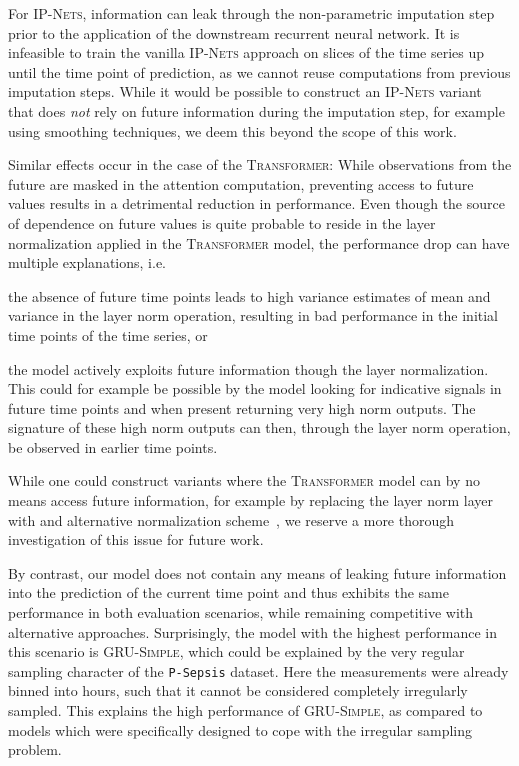\documentclass{article}
\newcommand{\dataset}[1]{\texttt{#1}}
\newcommand{\method}[1]{\textsc{#1}}
\begin{document}
For \method{IP-Nets}, information can leak through the non-parametric imputation
step prior to the application of the downstream recurrent neural network.  It
is infeasible to train the vanilla \method{IP-Nets} approach on slices of the
time series up until the time point of prediction, as we cannot reuse
computations from previous imputation steps.  While it would be possible to
construct an \method{IP-Nets} variant that does \emph{not} rely on future information
during the imputation step, for example using smoothing techniques, we deem
this beyond the scope of this work.

Similar effects occur in the case of the \method{Transformer}: While
observations from the future are masked in the attention computation,
preventing access to future values results in a detrimental reduction in
performance. Even though the source of dependence on future values is quite
probable to reside in the layer normalization applied in the
\method{Transformer} model, the performance drop can have multiple
explanations, i.e.\
\begin{inparaenum}
\item the absence of future time points leads to high variance estimates of
    mean and variance in the layer norm operation, resulting in bad performance
    in the initial time points of the time series, or
\item the model actively exploits future information though the layer
    normalization.  This could for example be possible by the model looking for
    indicative signals in future time points and when present returning very
    high norm outputs.  The signature of these high norm outputs can then,
    through the layer norm operation, be observed in earlier time points.
\end{inparaenum}
While one could construct variants where the \method{Transformer} model can by
no means access future information, for example by replacing the layer norm
layer with and alternative normalization scheme~\citep{nguyen2019transformers,
bachlechner2020rezero}, we reserve a more thorough investigation of this issue
for future work.

By contrast, our model does not contain any means of leaking future
information into the prediction of the current time point and thus
exhibits the same performance in both evaluation scenarios,  while
remaining competitive with alternative approaches.
Surprisingly, the model with the highest performance in this scenario is
\method{GRU-Simple}, which could be explained by the very regular sampling
character of the \dataset{P-Sepsis} dataset.  Here the measurements were
already binned into hours, such that it cannot be considered completely
irregularly sampled.  This explains the high performance of
\method{GRU-Simple}, as compared to models which were specifically
designed to cope with the irregular sampling problem.
\end{document}
